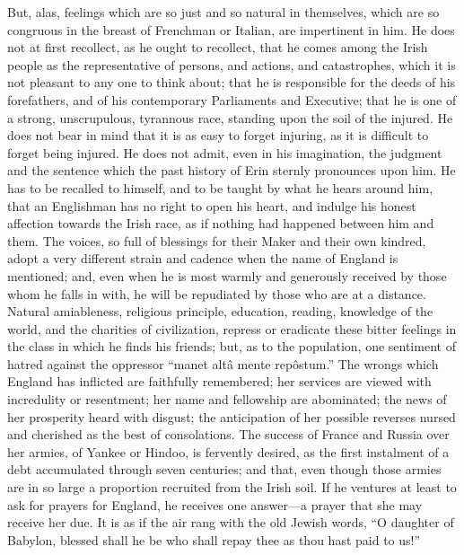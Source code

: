 But, alas, feelings which are
so just and so natural in themselves, which are so congruous in the
breast of Frenchman or Italian, are impertinent in him. He does not at
first recollect, as he ought to recollect, that he comes among the
Irish people as the representative of persons, and actions, and
catastrophes, which it is not pleasant to any one to think about; that
he is responsible for the deeds of his forefathers, and of his
contemporary Parliaments and Executive; that he is one of a strong,
unscrupulous, tyrannous race, standing upon the soil of the
injured. He does not bear in mind that it is as easy to forget
injuring, as it is difficult to forget being injured. He does not
admit, even in his imagination, the judgment and the sentence which
the past history of Erin sternly pronounces upon him. He has to be
recalled to himself, and to be taught by what he hears around him,
that an Englishman has no right to open his heart, and indulge his
honest affection towards the Irish race, as if nothing had happened
between him and them. The voices, so full of blessings for their Maker
and their own kindred, adopt a very different strain and cadence when
the name of England is mentioned; and, even when he is most warmly and
generously received by those whom he falls in with, he will be
repudiated by those who are at a distance. Natural amiableness,
religious principle, education, reading, knowledge of the world, and
the charities of civilization, repress or eradicate these bitter
feelings in the class in which he finds his friends; but, as to the
population, one sentiment of hatred against the oppressor ``manet altâ
mente repôstum.'' The wrongs which England has inflicted are
faithfully remembered; her services are viewed with incredulity or
resentment; her name and fellowship are abominated; the news of her
prosperity heard with disgust; the anticipation of her possible
reverses nursed and cherished as the best of consolations. The success
of France and Russia over her armies, of Yankee or Hindoo, is
fervently desired, as the first instalment of a debt accumulated
through seven centuries; and that, even though those armies are in so
large a proportion recruited from the Irish soil. If he ventures at
least to ask for prayers for England, he receives one answer—a
prayer that she may receive her due. It is as if the air rang with the
old Jewish words, ``O daughter of Babylon, blessed shall he be
who shall repay thee as thou hast paid to us!''

